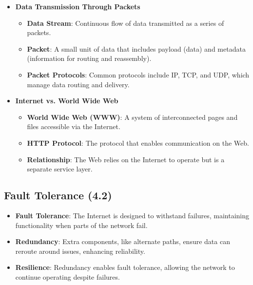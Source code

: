\begin{itemize}
    \item \textbf{Data Transmission Through Packets}
        \begin{itemize}
            \item \textbf{Data Stream}: Continuous flow of data transmitted as a series of packets. %
            \item \textbf{Packet}: A small unit of data that includes payload (data) and metadata (information for routing and reassembly). %
            \item \textbf{Packet Protocols}: Common protocols include IP, TCP, and UDP, which manage data routing and delivery. %
        \end{itemize}

    \item \textbf{Internet vs. World Wide Web}
        \begin{itemize}
            \item \textbf{World Wide Web (WWW)}: A system of interconnected pages and files accessible via the Internet. %
            \item \textbf{HTTP Protocol}: The protocol that enables communication on the Web. %
            \item \textbf{Relationship}: The Web relies on the Internet to operate but is a separate service layer. %
        \end{itemize}
\end{itemize}

\subsection*{Fault Tolerance (4.2)}

\begin{itemize}
    \item \textbf{Fault Tolerance}: The Internet is designed to withstand failures, maintaining functionality when parts of the network fail. %
    \item \textbf{Redundancy}: Extra components, like alternate paths, ensure data can reroute around issues, enhancing reliability. %
    \item \textbf{Resilience}: Redundancy enables fault tolerance, allowing the network to continue operating despite failures. %
\end{itemize}


